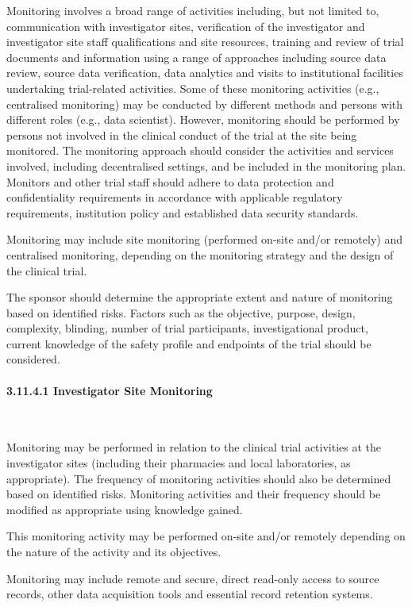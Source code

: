 \documentclass[11pt]{article}
\begin{document}
Monitoring involves a broad range of activities including, but not limited to, communication with investigator sites, verification of the investigator and investigator site staff qualifications and site resources, training and review of trial documents and information using a range of approaches including source data review, source data verification, data analytics and visits to institutional facilities undertaking trial-related activities. Some of these monitoring activities (e.g., centralised monitoring) may be conducted by different methods and persons with different roles (e.g., data scientist). However, monitoring should be performed by persons not involved in the clinical conduct of the trial at the site being monitored. The monitoring approach should consider the activities and services involved, including decentralised settings, and be included in the monitoring plan. Monitors and other trial staff should adhere to data protection and confidentiality requirements in accordance with applicable regulatory requirements, institution policy and established data security standards.


Monitoring may include site monitoring (performed on-site and/or remotely) and centralised monitoring, depending on the monitoring strategy and the design of the clinical trial.


The sponsor should determine the appropriate extent and nature of monitoring based on identified risks. Factors such as the objective, purpose, design, complexity, blinding, number of trial participants, investigational product, current knowledge of the safety profile and endpoints of the trial should be considered.


\paragraph{3.11.4.1 Investigator Site Monitoring}\mbox{}\\

\begin{description}[leftmargin=2.5cm,style=sameline]

\item[(a)] Monitoring may be performed in relation to the clinical trial activities at the investigator sites (including their pharmacies and local laboratories, as appropriate). The frequency of monitoring activities should also be determined based on identified risks. Monitoring activities and their frequency should be modified as appropriate using knowledge gained.

\item[(b)] This monitoring activity may be performed on-site and/or remotely depending on the nature of the activity and its objectives.

\item[(c)] Monitoring may include remote and secure, direct read-only access to source records, other data acquisition tools and essential record retention systems.

\end{description}
\end{document}
